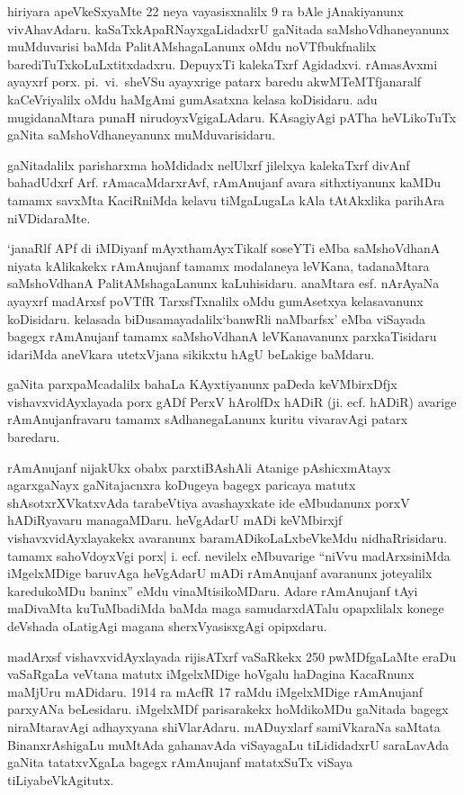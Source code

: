 hiriyara apeVkeSxyaMte {\rm 22} neya vayasisxnalilx {\rm 9} ra bAle jAnakiyanunx vivAha\-vAdaru. kaSaTxkApaRNayxgaLidadxrU gaNitada saMshoVdhaneyanunx muMduvarisi baMda PalitAMshagaLanunx oMdu noVTfbukfnalilx  barediTuTxkoLuLxtitxdadxru. DepuyxTi kalekaTxrf Agidadx\break vi. rAmasAvxmi ayayxrf porx. pi.~vi.\ sheVSu ayayxrige patarx baredu akwMTeMTf\break janaralf kaCeVriyalilx oMdu haMgAmi gumAsatxna kelasa koDisidaru. adu mugida\break naMtara punaH nirudoyxVgigaLAdaru. KAsagiyAgi pATha heVLikoTuTx gaNita saMshoVdhane\-yanunx muMduvarisidaru.

gaNitadalilx parisharxma hoMdidadx nelUlxrf jilelxya kalekaTxrf divAnf bahadUdxrf Arf. rAmacaMdarxrAvf, rAmAnujanf avara sithxtiyanunx kaMDu tamamx savxMta KaciRniMda kelavu tiMgaLugaLa kAla tAtAkxlika parihAra niVDidaraMte.

`janaRlf APf di iMDiyanf mAyxthamAyxTikalf soseYTi eMba saMshoV\-dhanA niyata kAlikakekx rAmAnujanf tamamx modalaneya leVKana, tadanaMtara saMshoV\-dhanA PalitAMshagaLanunx kaLuhisidaru. anaMtara esf. nArAyaNa ayayxrf madArxsf poVTfR TarxsfTxnalilx oMdu gumAsetxya kelasavanunx koDisidaru. kelasada biDusamayadalilx\break  `banwRli naMbarfsx' eMba viSayada bagegx rAmAnujanf tamamx saMshoVdhanA leVKanavanunx parxkaTisidaru idariMda aneVkara utetxVjana sikikxtu hAgU beLakige baMdaru.

gaNita parxpaMcadalilx bahaLa KAyxtiyanunx paDeda keVMbirxDfjx vishavxvidAyxlayada porx gADf PerxV hArolfDx hADiR (ji. ecf. hADiR) avarige rAmAnujanfravaru tamamx sAdhanegaLanunx kuritu vivaravAgi patarx baredaru.

rAmAnujanf nijakUkx obabx parxtiBAshAli Atanige pAshicxmAtayx agarxgaNayx gaNitajacnxra koDugeya bagegx paricaya matutx shAsotxrXVkatxvAda tarabeVtiya avashayxkate ide eMbu\-danunx porxV hADiRyavaru managaMDaru. heVgAdarU mADi keVMbirxjf vishavxvidAyxlayakekx avaranunx baramADikoLaLxbeVkeMdu nidhaRrisidaru. tamamx sahoVdoyxVgi porx| i. ecf. nevilelx eMbuvarige ``niVvu madArxsiniMda iMgelxMDige baruvAga heVgAdarU mADi rAmA\-nujanf avaranunx joteyalilx karedukoMDu baninx'' eMdu vinaMtisikoMDaru. Adare rAmAnujanf tAyi maDivaMta kuTuMbadiMda baMda maga samudarxdATalu opapxlilalx konege deVshada oLatigAgi magana sherxVyasisxgAgi opipxdaru.

madArxsf vishavxvidAyxlayada rijisATxrf vaSaRkekx {\rm 250} pwMDfgaLaMte eraDu vaSaRgaLa veVtana matutx iMgelxMDige hoVgalu haDagina KacaRnunx maMjUru mADidaru.  {\rm 1914} ra mAcfR {\rm 17} raMdu iMgelxMDige rAmAnujanf parxyANa beLesidaru. iMgelxMDf parisarakekx hoMdikoMDu gaNitada bagegx niraMtaravAgi adhayxyana shiVlarAdaru. mADuyx\-larf samiVkaraNa saMtata BinanxrAshigaLu muMtAda gahanavAda viSayagaLu tiLididadxrU saraLavAda gaNita tatatxvXgaLa bagegx rAmAnujanf matatxSuTx viSaya tiLiyabeVkAgitutx.

